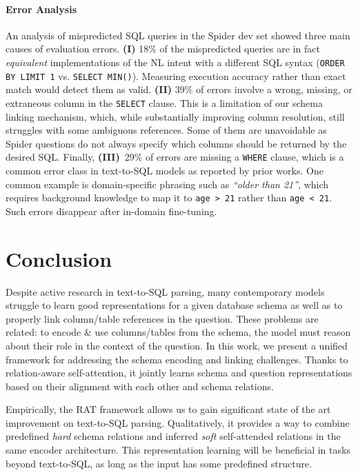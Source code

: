 \documentclass[11pt,a4paper,final]{article}
\begin{document}
\paragraph{Error Analysis}
An analysis of mispredicted SQL queries in the Spider dev set showed three main causes of evaluation errors.
\textbf{(I)} 18\% of the mispredicted queries are in fact \emph{equivalent} implementations of the NL intent with a different SQL syntax (\eg \texttt{ORDER BY  LIMIT 1} vs. \texttt{SELECT MIN()}).
Measuring execution accuracy rather than exact match would detect them as valid.
\textbf{(II)} 39\% of errors involve a wrong, missing, or extraneous column in the \texttt{SELECT} clause.
This is a limitation of our schema linking mechanism, which, while substantially improving column resolution, still struggles with some ambiguous references.
Some of them are unavoidable as Spider questions do not always specify which columns should be returned by the desired SQL.
Finally, \textbf{(III)}~29\% of errors are missing a \texttt{WHERE} clause, which is a common error class in text-to-SQL models as reported by prior works.
One common example is domain-specific phrasing such as \textit{``older than 21''}, which requires background knowledge to map it to \texttt{age > 21} rather than \texttt{age < 21}.
Such errors disappear after in-domain fine-tuning.








 \section{Conclusion}
\label{sec:conclusion}

Despite active research in text-to-SQL parsing, many contemporary models struggle to learn good
representations for a given database schema as well as to properly link column/table references in the question.
These problems are related: to encode \& use columns/tables from the schema, the model must reason about their role in
the context of the question.
In this work, we present a unified framework for addressing the schema encoding and linking challenges.
Thanks to relation-aware self-attention, it jointly learns schema and question representations based on their
alignment with each other and schema relations.

Empirically, the RAT framework allows us to gain significant state of the art improvement on text-to-SQL parsing.
Qualitatively, it provides a way to combine predefined \emph{hard} schema relations and inferred \emph{soft}
self-attended relations in the same encoder architecture.
This representation learning will be beneficial in tasks beyond text\hyp{}to\hyp{}SQL, as long as the
input has some predefined structure.
 
\end{document}
